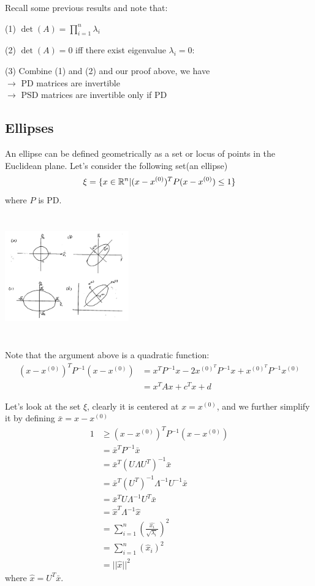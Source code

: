 Recall some previous results and note that:

(1) $\det(A) = \prod^n_{i=1}\lambda_i$

(2) $\det(A) = 0$ iff there exist eigenvalue $\lambda_i = 0$:

(3) Combine (1) and (2) and our proof above, we have
\\ \qquad $\rightarrow$ PD matrices are invertible
\\ \qquad $\rightarrow$ PSD matrices are invertible only if PD





\subsection{Ellipses} 

An ellipse can be defined geometrically as a set or locus of points in the Euclidean plane. Let's consider the following set(an ellipse)
$$
\xi = \{x\in \mathbb{R}^n | (x - x^{(0)})^T P(x - x^{(0)}) \leq 1 \}
$$
where $P$ is PD.

\begin{marginfigure}
	\centering
	\includegraphics[width=2.1in,height=2.1in]{figures/ch03/figure2.jpg}
\end{marginfigure}

Note that the argument above is a quadratic function:
\begin{align*}
(x - x^{(0)})^TP^{-1}(x - x^{(0)}) &= x^TP^{-1}x - 2x^{(0)^T}P^{-1}x + x^{(0)^T}P^{-1}x^{(0)}\\
&= x^TAx + c^Tx + d
\end{align*}

Let's look at the set $\xi$, clearly it is centered at $x = x^{(0)}$, and we further simplify it by defining $\bar{x}=x-x^{(0)}$
\begin{align*}
1 &\geq (x - x^{(0)})^TP^{-1}(x - x^{(0)})\\
&= \bar{x}^TP^{-1}\bar{x}\\
&= \bar{x}^T(U\Lambda U^T)^{-1}\bar{x}\\
&= \bar{x}^T(U^T)^{-1}\Lambda^{-1}U^{-1}\bar{x}\\
&= \bar{x}^TU\Lambda^{-1}U^T\bar{x}\\
&= \hat{x}^T\Lambda^{-1}\hat{x}\\
&= \sum^n_{i=1}(\frac{\hat{x_i}}{\sqrt{\lambda_i}})^2\\
&= \sum^n_{i=1}(\hat{x}_i)^2\\
&= ||\hat{x}||^2
\end{align*}
where $\hat{x}=U^T\bar{x}$.


